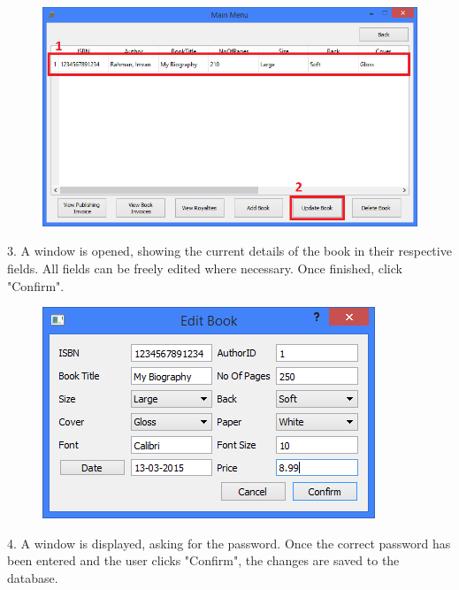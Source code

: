 \begin{figure}[H]
    \includegraphics[width=\textwidth]{./Manual/Tutorial/Q6/UpdateBook.png}
\end{figure}

3. A window is opened, showing the current details of the book in their respective fields. All fields can be freely edited where necessary. Once finished, click "Confirm".

\begin{figure}[H]
    \includegraphics[width=\textwidth]{./Manual/Tutorial/Q6/EditBook.png}
\end{figure}

4. A window is displayed, asking for the password. Once the correct password has been entered and the user clicks "Confirm", the changes are saved to the database.

